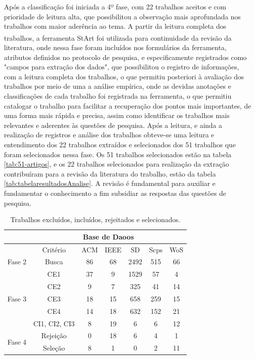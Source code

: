 Após a classificação foi iniciada a 4º fase, com 22 trabalhos aceitos e com prioridade de leitura alta, que possibilitou a observação mais aprofundada nos trabalhos com maior aderência ao tema. A partir da leitura completa dos trabalhos, a ferramenta \acrshort{StArt}\textsuperscript{\textregistered} foi utilizada para continuidade da revisão da literatura, onde nessa fase foram incluídos nos formulários da ferramenta, atributos definidos no protocolo de pesquisa, e especificamente registrados como "campos para extração dos dados", que possibilitou o registro de informações, com a leitura completa dos trabalhos, o  que permitiu posteriori à avaliação dos trabalhos por meio de uma a análise empírica, onde as devidas anotações e classificações de cada trabalho foi registrada na ferramenta, o que permitiu catalogar o trabalho para facilitar a recuperação dos pontos mais importantes, de uma forma mais rápida e precisa, assim como identificar os trabalhos mais relevantes e aderentes às questões de pesquisa. Após a leitura, e ainda a realização de registros e análise dos trabalhos obteve-se uma leitura e entendimento dos 22 trabalhos extraídos e selecionados dos 51 trabalhos que foram selecionados nessa fase. Os 51 trabalhos selecionados estão na tabela \ref{tab:51-artigos}, e os 22 trabalhos selecionados para  realização da extração contribuíram para a revisão da literatura do trabalho, estão da tabela \ref{tab:tabelaresultadosAnalise}. A revisão é fundamental para auxiliar e fundamentar o conhecimento a fim subsidiar as respostas das questões de pesquisa. 

\vspace{20mm}

\begin{longtable}{c|c|c|c|c|c|c|}
\caption{Trabalhos excluídos, incluídos, rejeitados e selecionados.}
\label{tab:fase-revisao-literatura}\\
\cline{2-7}
 & \multicolumn{6}{c|}{Base de Daoos} \\ \cline{2-7} 
\endfirsthead
%
\endhead
%
 & Critério & \acrshort{ACM} & \acrlong{IEEE} & \acrlong{SD} & \acrlong{Scps} & \acrlong{WoS} \\ \hline
\multicolumn{1}{|c|}{Fase 2} & Busca & 86 & 68 & 2492 & 515 & 66 \\ \hline
\multicolumn{1}{|c|}{\multirow{5}{*}{Fase 3}} & CE1 & 37 & 9 & 1529 & 57 & 4 \\ \cline{2-7} 
\multicolumn{1}{|c|}{} & CE2 & 9 & 7 & 325 & 41 & 14 \\ \cline{2-7} 
\multicolumn{1}{|c|}{} & CE3 & 18 & 15 & 658 & 259 & 15 \\ \cline{2-7} 
\multicolumn{1}{|c|}{} & CE4 & 14 & 18 & 632 & 152 & 21 \\ \cline{2-7} 
\multicolumn{1}{|c|}{} & CI1, CI2, CI3 & 8 & 19 & 6 & 6 & 12 \\ \hline
\multicolumn{1}{|c|}{\multirow{2}{*}{Fase 4}} & Rejeição & 0 & 18 & 6 & 4 & 1 \\ \cline{2-7} 
\multicolumn{1}{|c|}{} & Seleção & 8 & 1 & 0 & 2 & 11 \\ \hline
\end{longtable}



